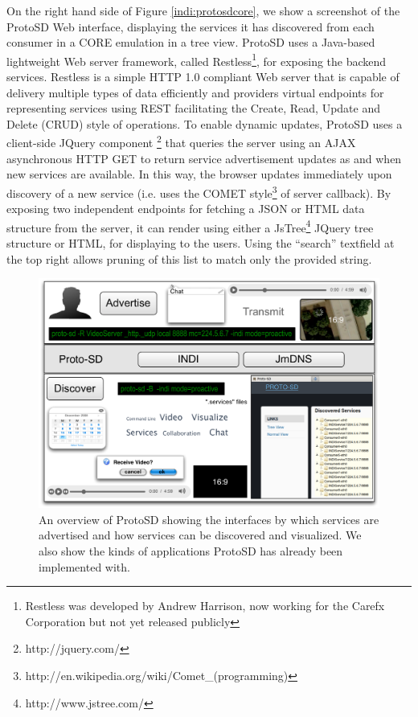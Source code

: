 On the right hand side of Figure \ref{indi:protosdcore}, we show a screenshot of the ProtoSD Web interface, displaying the services it has discovered from each consumer in a CORE emulation in a tree view.  ProtoSD uses a Java-based lightweight Web server framework, called Restless\footnote{Restless was developed by Andrew Harrison, now working for  the Carefx Corporation but not yet released publicly}, for exposing the backend services.   Restless is a simple HTTP 1.0 compliant Web server that is capable of delivery multiple types of data efficiently and providers virtual endpoints for representing services using REST facilitating the Create, Read, Update and Delete (CRUD) style of operations.  To enable dynamic updates, ProtoSD uses a client-side JQuery component \footnote{http://jquery.com/}  that queries the server using an AJAX asynchronous HTTP GET to return service advertisement updates as and when new services are available. In this way, the browser updates immediately upon discovery of a new service (i.e. uses the COMET style\footnote{http://en.wikipedia.org/wiki/Comet\_(programming)} of server callback). By exposing two independent endpoints for fetching a JSON or HTML data structure from the server, it can render  using either a JsTree\footnote{http://www.jstree.com/} JQuery tree structure or HTML, for displaying to the users. Using the ``search'' textfield at the top right allows pruning of this list to match only the provided string.  

\begin{figure}[h!]
\centering
\includegraphics[width=5.5in]{ProtoSD.pdf}
\caption{An overview of ProtoSD showing the interfaces by which services are advertised and how services can be discovered and visualized.   We also show the kinds of applications ProtoSD has already been implemented with.} 
\label{indi:protosd}
\end{figure}

